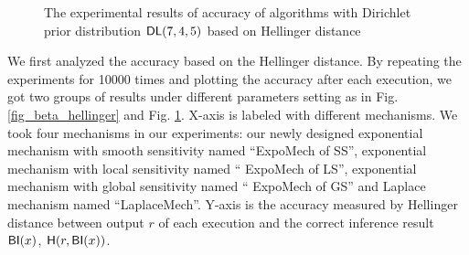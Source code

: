 \begin{figure}
\begin{center}
\centering
\caption{The experimental results of accuracy of algorithms with Dirichlet prior distribution $\mathsf{DL}(7, 4, 5)$ based on Hellinger distance}
\label{fig_dirichlet_hellinger}
\end{center}
\end{figure}

We first analyzed the accuracy based on the Hellinger distance. By repeating the experiments for 10000 times and plotting the accuracy after each execution, we got two groups of results under different parameters setting as in Fig. \ref{fig_beta_hellinger} and Fig. \ref{fig_dirichlet_hellinger}. X-axis is labeled with different mechanisms. We took four mechanisms in our experiments: our newly designed exponential mechanism with smooth sensitivity named ``ExpoMech of SS'', exponential mechanism with local sensitivity named `` ExpoMech of LS'', exponential mechanism with global sensitivity named `` ExpoMech of GS'' and Laplace mechanism named ``LaplaceMech''. Y-axis is the accuracy measured by Hellinger distance between output $r$ of each execution and the correct inference result $\mathsf{BI}(x)$, $\mathsf{H}(r, \mathsf{BI}(x))$.

